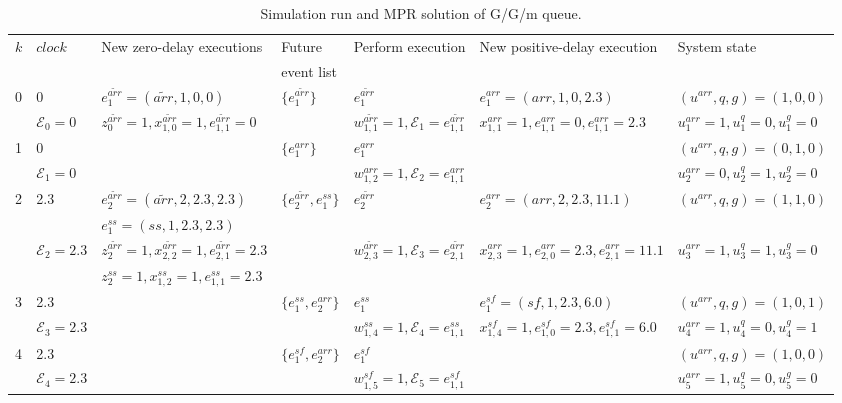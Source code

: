 \documentclass[suppldata]{interact}
\theoremstyle{plain}
\theoremstyle{definition}
\theoremstyle{remark}
\begin{document}
\begin{landscape}
	\begin{table}
		\caption{Simulation run and MPR solution of G/G/m queue.}
		\label{tab:sol_GGM}
		\begin{tabular}{lllllll}
			\hline
			$k$&$clock$&New zero-delay executions& Future  &Perform execution  &New positive-delay execution&System state \\
			&&&  event list &  && \\\hline
			
			
			0 & 0 & $e^{\tilde{arr}}_1=({\tilde{arr}},1,0,0)$ &$\{e^{\tilde{arr}}_1\}$&$e^{\tilde{arr}}_1$&$e^{{arr}}_1=({{arr}},1,0,2.3)$&$(u^{arr},q,g)=(1,0,0)$\\
			& $\mathcal{E}_0=0$& $z^{\tilde{arr}}_0=1, x^{\tilde{arr}}_{1,0}=1,e^{\tilde{arr}}_{1,1}=0$ &&$w^{\tilde{arr}}_{1,1}=1,\mathcal{E}_1=e^{\tilde{arr}}_{1,1}$& 
			$x^{{arr}}_{1,1}=1, e^{{arr}}_{1,1}=0, e^{{arr}}_{1,1}=2.3$ &$u^{arr}_1=1,u^{q}_1=0,u^{g}_1=0$\\\hline
			
			
			1 & 0 & &$\{e^{{arr}}_1\}$&$e^{{arr}}_1$&&$(u^{arr},q,g)=(0,1,0)$\\
			&$\mathcal{E}_1=0$&&&$w^{{arr}}_{1,2}=1,\mathcal{E}_2=e^{{arr}}_{1,1}$&&$u^{arr}_2=0,u^{q}_2=1,u^{g}_2=0$\\\hline
			
			
			2 &2.3 &$e^{\tilde{arr}}_2=({\tilde{arr}},2,2.3,2.3)$&$\{e^{\tilde{arr}}_2,e^{ss}_1\}$ &$e^{\tilde{arr}}_2$ &$e^{{arr}}_2=({{arr}},2,2.3,11.1)$ &$(u^{arr},q,g)=(1,1,0)$\\
			&&$e^{ss}_1=(ss,1,2.3,2.3)$&&&&\\
			&$\mathcal{E}_2=2.3$&$z^{\tilde{arr}}_2=1, x^{\tilde{arr}}_{2,2}=1,e^{\tilde{arr}}_{2,1}=2.3$&&$w^{\tilde{arr}}_{2,3}=1,\mathcal{E}_3=e^{\tilde{arr}}_{2,1}$&$x^{{arr}}_{2,3}=1, e^{{arr}}_{2,0}=2.3, e^{{arr}}_{2,1}=11.1$&$u^{arr}_3=1,u^{q}_3=1,u^{g}_3=0$\\
			&&$z^{ss}_2=1,x^{ss}_{1,2}=1,e^{ss}_{1,1}=2.3$ &&&&\\\hline
			
			
			3 & 2.3& & $\{e^{ss}_1,e^{arr}_2\}$&$e^{ss}_1$&$e^{sf}_1=(sf,1,2.3,6.0)$&$(u^{arr},q,g)=(1,0,1)$\\
			&$\mathcal{E}_3=2.3$&&&$w^{{ss}}_{1,4}=1,\mathcal{E}_4=e^{{ss}}_{1,1}$&$x^{{sf}}_{1,4}=1, e^{{sf}}_{1,0}=2.3, e^{{sf}}_{1,1}=6.0$&$u^{arr}_4=1,u^{q}_4=0,u^{g}_4=1$\\\hline
			
			
			4 & 2.3&&$\{e^{sf}_1,e^{arr}_2\}$&$e^{sf}_{1}$&&$(u^{arr},q,g)=(1,0,0)$\\
			&$\mathcal{E}_4=2.3$&&&$w^{{sf}}_{1,5}=1,\mathcal{E}_5=e^{{sf}}_{1,1}$&&$u^{arr}_5=1,u^{q}_5=0,u^{g}_5=0$\\\hline
			

\end{tabular}
\end{table}
\end{landscape}
\end{document}
